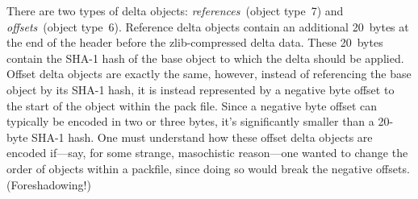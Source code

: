 \documentclass{article}
\begin{document}
{\selectfont\begin{center}
\end{center}}

There are two types of delta objects: \emph{references}~(object
type~7) and \emph{offsets}~(object type~6).  Reference delta objects
contain an additional 20~bytes at the end of the header before the
zlib-compressed delta data. These 20~bytes contain the SHA-1 hash of
the base object to which the delta should be applied.  Offset delta
objects are exactly the same, however, instead of referencing the base
object by its SHA-1 hash, it is instead represented by a negative byte
offset to the start of the object within the pack file.  Since a
negative byte offset can typically be encoded in two or three bytes,
it's significantly smaller than a 20-byte SHA-1 hash.  One must
understand how these offset delta objects are encoded if---say, for
some strange, masochistic reason---one wanted to change the order of
objects within a packfile, since doing so would break the negative
offsets. (Foreshadowing!)
\end{document}
